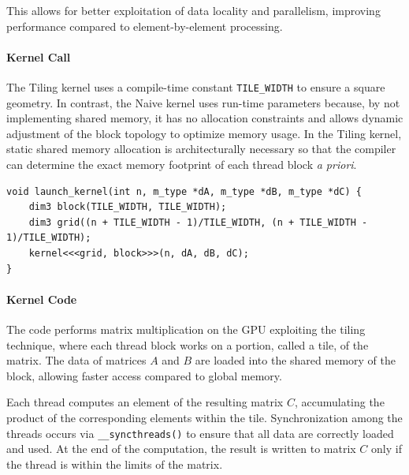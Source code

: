This allows for better exploitation of data locality and parallelism, improving performance compared to element-by-element processing.
\paragraph{Kernel Call}
The Tiling kernel uses a compile-time constant \texttt{TILE\_WIDTH} to ensure a square geometry. In contrast, the Naive kernel uses run-time parameters because, by not implementing shared memory, it has no allocation constraints and allows dynamic adjustment of the block topology to optimize memory usage. In the Tiling kernel, static shared memory allocation is architecturally necessary so that the compiler can determine the exact memory footprint of each thread block \textit{a priori}.
\begin{lstlisting}[style=CStyle, caption={Code to launch Kernel 2}, label={lst:cuda_coalesced_kernel}]
void launch_kernel(int n, m_type *dA, m_type *dB, m_type *dC) {
    dim3 block(TILE_WIDTH, TILE_WIDTH);
    dim3 grid((n + TILE_WIDTH - 1)/TILE_WIDTH, (n + TILE_WIDTH - 1)/TILE_WIDTH);
    kernel<<<grid, block>>>(n, dA, dB, dC);
}
\end{lstlisting}
\paragraph{Kernel Code}The code performs matrix multiplication on the GPU exploiting the tiling technique, where each thread block works on a portion, called a tile, of the matrix. The data of matrices $A$ and $B$ are loaded into the shared memory of the block, allowing faster access compared to global memory.

Each thread computes an element of the resulting matrix $C$, accumulating the product of the corresponding elements within the tile. Synchronization among the threads occurs via \texttt{\_\_syncthreads()} to ensure that all data are correctly loaded and used. At the end of the computation, the result is written to matrix $C$ only if the thread is within the limits of the matrix. 

